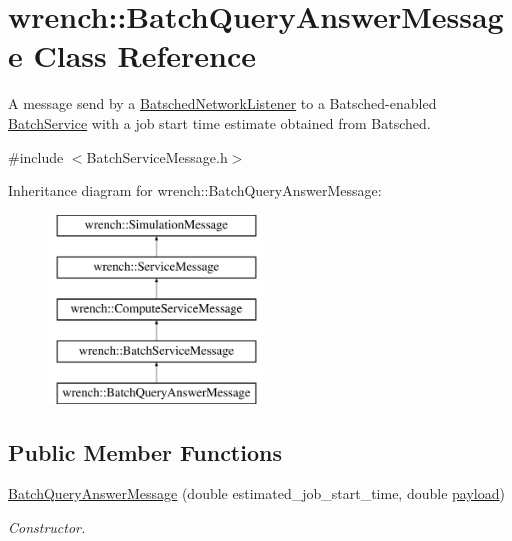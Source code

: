 \hypertarget{classwrench_1_1_batch_query_answer_message}{}\section{wrench\+:\+:Batch\+Query\+Answer\+Message Class Reference}
\label{classwrench_1_1_batch_query_answer_message}


A message send by a \hyperlink{classwrench_1_1_batsched_network_listener}{Batsched\+Network\+Listener} to a Batsched-\/enabled \hyperlink{classwrench_1_1_batch_service}{Batch\+Service} with a job start time estimate obtained from Batsched.  




{\ttfamily \#include $<$Batch\+Service\+Message.\+h$>$}

Inheritance diagram for wrench\+:\+:Batch\+Query\+Answer\+Message\+:\begin{figure}[H]
\begin{center}
\leavevmode
\includegraphics[height=5.000000cm]{classwrench_1_1_batch_query_answer_message}
\end{center}
\end{figure}
\subsection*{Public Member Functions}
\begin{DoxyCompactItemize}
\item 
\hyperlink{classwrench_1_1_batch_query_answer_message_a10b010b2246f82e9ec6d2803a97b6597}{Batch\+Query\+Answer\+Message} (double estimated\+\_\+job\+\_\+start\+\_\+time, double \hyperlink{classwrench_1_1_simulation_message_a914f2732713f7c02898e66f05a7cb8a1}{payload})
\begin{DoxyCompactList}\small\item\em Constructor. \end{DoxyCompactList}\end{DoxyCompactItemize}
